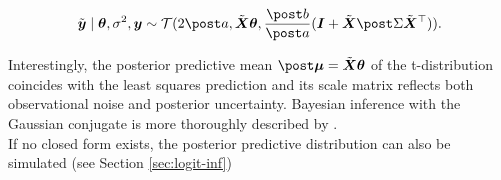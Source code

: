 \begin{equation*}
    \ty \mid \btheta, \ssd, \by \sim \Tcal(2 \apo, \tX \btheta, \frac{\bpo}{\apo} (\bI + \tX \Sdpo \tX^\top)).
\end{equation*}

Interestingly, the posterior predictive mean $\mupo = \tX \btheta$ of the t-distribution coincides with the least squares prediction and its scale matrix reflects both observational noise and posterior uncertainty.
Bayesian inference with the Gaussian conjugate is more thoroughly described by \citet{murphy_conjugate_nodate}.\\

If no closed form exists, the posterior predictive distribution can also be simulated (see Section \ref{sec:logit-inf})
